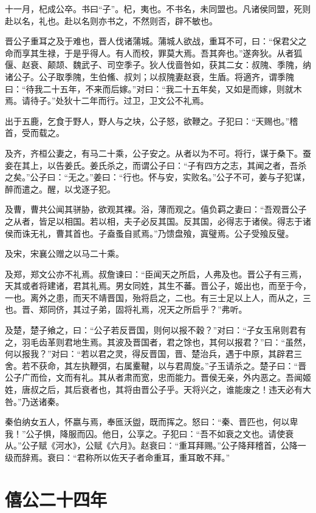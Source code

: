 \documentclass[a4paper,12pt,UTF8,twoside]{ctexbook}
\begin{document}
十一月，杞成公卒。书曰“子”。杞，夷也。不书名，未同盟也。凡诸侯同盟，死则赴以名，礼也。赴以名则亦书之，不然则否，辟不敏也。

晋公子重耳之及于难也，晋人伐诸蒲城。蒲城人欲战，重耳不可，曰：“保君父之命而享其生禄，于是乎得人。有人而校，罪莫大焉。吾其奔也。”遂奔狄。从者狐偃、赵衰、颠颉、魏武子、司空季子。狄人伐啬咎如，获其二女：叔隗、季隗，纳诸公子。公子取季隗，生伯鯈、叔刘；以叔隗妻赵衰，生盾。将適齐，谓季隗曰：“待我二十五年，不来而后嫁。”对曰：“我二十五年矣，又如是而嫁，则就木焉。请待子。”处狄十二年而行。过卫，卫文公不礼焉。

出于五鹿，乞食于野人，野人与之块，公子怒，欲鞭之。子犯曰：“天赐也。”稽首，受而载之。

及齐，齐桓公妻之，有马二十乘，公子安之。从者以为不可。将行，谋于桑下。蚕妾在其上，以告姜氏。姜氏杀之，而谓公子曰：“子有四方之志，其闻之者，吾杀之矣。”公子曰：“无之。”姜曰：“行也。怀与安，实败名。”公子不可，姜与子犯谋，醉而遣之。醒，以戈逐子犯。

及曹，曹共公闻其骈胁，欲观其裸。浴，薄而观之。僖负羁之妻曰：“吾观晋公子之从者，皆足以相国。若以相，夫子必反其国。反其国，必得志于诸侯。得志于诸侯而诛无礼，曹其首也。子盍蚤自贰焉。”乃馈盘飱，寘璧焉。公子受飱反璧。

及宋，宋襄公赠之以马二十乘。

及郑，郑文公亦不礼焉。叔詹谏曰：“臣闻天之所启，人弗及也。晋公子有三焉，天其或者将建诸，君其礼焉。男女同姓，其生不蕃。晋公子，姬出也，而至于今，一也。离外之患，而天不靖晋国，殆将启之，二也。有三士足以上人，而从之，三也。晋、郑同侪，其过子弟，固将礼焉，况天之所启乎？”弗听。

及楚，楚子飨之，曰：“公子若反晋国，则何以报不穀？”对曰：“子女玉帛则君有之，羽毛齿革则君地生焉。其波及晋国者，君之馀也，其何以报君？”曰：“虽然，何以报我？”对曰：“若以君之灵，得反晋国，晋、楚治兵，遇于中原，其辟君三舍。若不获命，其左执鞭弭，右属櫜鞬，以与君周旋。”子玉请杀之。楚子曰：“晋公子广而俭，文而有礼。其从者肃而宽，忠而能力。晋侯无亲，外内恶之。吾闻姬姓，唐叔之后，其后衰者也，其将由晋公子乎。天将兴之，谁能废之！违天必有大咎。”乃送诸秦。

秦伯纳女五人，怀嬴与焉，奉匜沃盥，既而挥之。怒曰：“秦、晋匹也，何以卑我！”公子惧，降服而囚。他日，公享之。子犯曰：“吾不如衰之文也。请使衰从。”公子赋《河水》，公赋《六月》。赵衰曰：“重耳拜赐。”公子降拜稽首，公降一级而辞焉。衰曰：“君称所以佐天子者命重耳，重耳敢不拜。”

\section{僖公二十四年}
\end{document}
